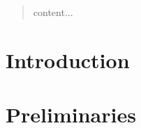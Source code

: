 \documentclass[fleqn, abstract=on]{scrreprt}
\begin{document}
\begin{abstract}
	content...
\end{abstract}

\renewcommand{\contentsname}{Contents}
\tableofcontents   %
\listoffigures     %

\newpage               %


%   
%   

\chapter{Introduction}
\chapter{Preliminaries}
\end{document}

